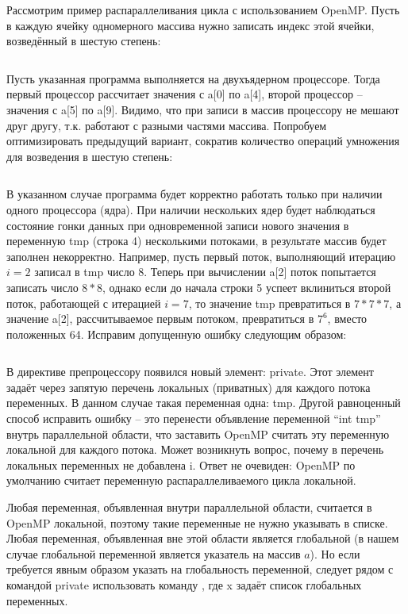 Рассмотрим пример распараллеливания цикла с использованием OpenMP. Пусть в каждую ячейку одномерного массива нужно записать индекс этой ячейки, возведённый в шестую степень:

\inputminted{c++}{listings/OpenMPExample5.cpp}

Пусть указанная программа выполняется на двухъядерном процессоре. Тогда первый процессор рассчитает значения с a[0] по a[4], второй процессор – значения с a[5] по a[9]. Видимо, что при записи в массив процессору не мешают друг другу, т.к. работают с разными частями массива. Попробуем оптимизировать предыдущий вариант, сократив количество операций умножения для возведения в шестую степень:

\inputminted{c++}{listings/OpenMPExample6.cpp}

В указанном случае программа будет корректно работать только при наличии одного процессора (ядра). При наличии нескольких ядер будет наблюдаться состояние гонки данных при одновременной записи нового значения в переменную tmp (строка 4) несколькими потоками, в результате массив будет заполнен некорректно. Например, пусть первый поток, выполняющий итерацию $i=2$ записал в tmp число 8. Теперь при вычислении a[2] поток попытается записать число $8*8$, однако если до начала строки 5 успеет вклиниться второй поток, работающей с итерацией $i=7$, то значение tmp превратиться в $7*7*7$, а значение a[2], рассчитываемое первым потоком, превратиться в $7^6$, вместо положенных 64. Исправим допущенную ошибку следующим образом:

\inputminted{c++}{listings/OpenMPExample7.cpp}

В директиве препроцессору появился новый элемент: private. Этот элемент задаёт через запятую перечень локальных (приватных) для каждого потока переменных. В данном случае такая переменная одна: tmp. Другой равноценный способ исправить ошибку -- это перенести объявление переменной ``int tmp'' внутрь параллельной области, что заставить OpenMP считать эту переменную локальной для каждого потока. Может возникнуть вопрос, почему в перечень локальных переменных не добавлена i. Ответ не очевиден: OpenMP по умолчанию считает переменную распараллеливаемого цикла локальной.

Любая переменная, объявленная внутри параллельной области, считается в OpenMP локальной, поэтому такие переменные не нужно указывать в списке. Любая переменная, объявленная вне этой области является глобальной (в нашем случае глобальной переменной является указатель на массив $a$). Но если требуется явным образом указать на глобальность переменной, следует рядом с командой private использовать команду , где x задаёт список глобальных переменных.

